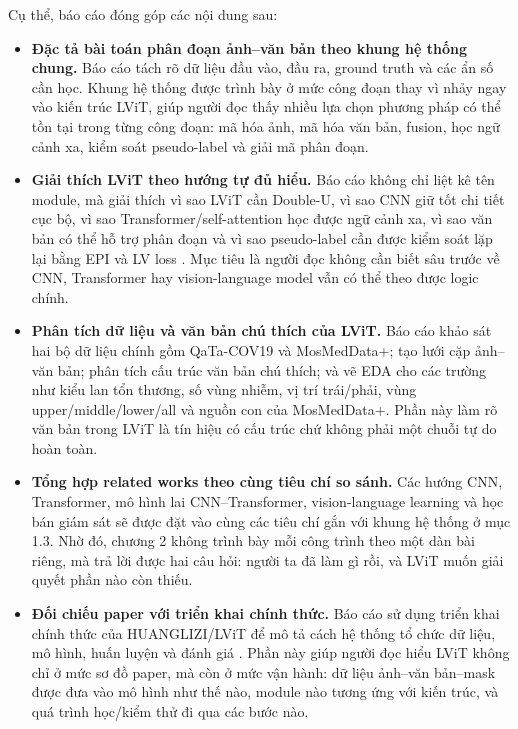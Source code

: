 Cụ thể, báo cáo đóng góp các nội dung sau:
\begin{itemize}
  \item \textbf{Đặc tả bài toán phân đoạn ảnh--văn bản theo khung hệ thống chung.} Báo cáo tách rõ dữ liệu đầu vào, đầu ra, ground truth và các ẩn số cần học. Khung hệ thống được trình bày ở mức công đoạn thay vì nhảy ngay vào kiến trúc LViT, giúp người đọc thấy nhiều lựa chọn phương pháp có thể tồn tại trong từng công đoạn: mã hóa ảnh, mã hóa văn bản, fusion, học ngữ cảnh xa, kiểm soát pseudo-label và giải mã phân đoạn.

  \item \textbf{Giải thích LViT theo hướng tự đủ hiểu.} Báo cáo không chỉ liệt kê tên module, mà giải thích vì sao LViT cần Double-U, vì sao CNN giữ tốt chi tiết cục bộ, vì sao Transformer/self-attention học được ngữ cảnh xa, vì sao văn bản có thể hỗ trợ phân đoạn và vì sao pseudo-label cần được kiểm soát lặp lại bằng EPI và LV loss \cite{li2023lvit}. Mục tiêu là người đọc không cần biết sâu trước về CNN, Transformer hay vision-language model vẫn có thể theo được logic chính.

  \item \textbf{Phân tích dữ liệu và văn bản chú thích của LViT.} Báo cáo khảo sát hai bộ dữ liệu chính gồm QaTa-COV19 và MosMedData+; tạo lưới cặp ảnh--văn bản; phân tích cấu trúc văn bản chú thích; và vẽ EDA cho các trường như kiểu lan tổn thương, số vùng nhiễm, vị trí trái/phải, vùng upper/middle/lower/all và nguồn con của MosMedData+. Phần này làm rõ văn bản trong LViT là tín hiệu có cấu trúc chứ không phải một chuỗi tự do hoàn toàn.

  \item \textbf{Tổng hợp related works theo cùng tiêu chí so sánh.} Các hướng CNN, Transformer, mô hình lai CNN--Transformer, vision-language learning và học bán giám sát sẽ được đặt vào cùng các tiêu chí gắn với khung hệ thống ở mục 1.3. Nhờ đó, chương 2 không trình bày mỗi công trình theo một dàn bài riêng, mà trả lời được hai câu hỏi: người ta đã làm gì rồi, và LViT muốn giải quyết phần nào còn thiếu.

  \item \textbf{Đối chiếu paper với triển khai chính thức.} Báo cáo sử dụng triển khai chính thức của HUANGLIZI/LViT để mô tả cách hệ thống tổ chức dữ liệu, mô hình, huấn luyện và đánh giá \cite{lvitOfficialRepo}. Phần này giúp người đọc hiểu LViT không chỉ ở mức sơ đồ paper, mà còn ở mức vận hành: dữ liệu ảnh--văn bản--mask được đưa vào mô hình như thế nào, module nào tương ứng với kiến trúc, và quá trình học/kiểm thử đi qua các bước nào.


\end{itemize}
